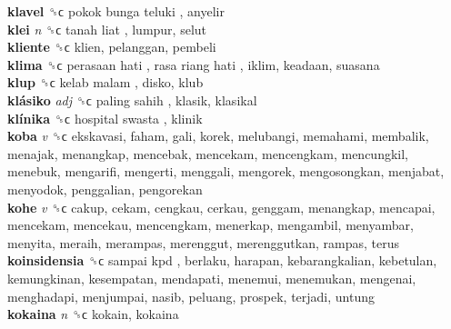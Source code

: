 \textbf{klavel} ␝ϲ   pokok bunga teluki , anyelir  \\
\textbf{klei} \emph{n}  ␝ϲ   tanah liat , lumpur, selut  \\
\textbf{kliente} ␝ϲ  klien, pelanggan, pembeli  \\
\textbf{klima} ␝ϲ   perasaan hati ,  rasa riang hati , iklim, keadaan, suasana  \\
\textbf{klup} ␝ϲ   kelab malam , disko, klub  \\
\textbf{klásiko} \emph{adj}  ␝ϲ   paling sahih , klasik, klasikal  \\
\textbf{klínika} ␝ϲ   hospital swasta , klinik  \\
\textbf{koba} \emph{v}  ␝ϲ  ekskavasi, faham, gali, korek, melubangi, memahami, membalik, menajak, menangkap, mencebak, mencekam, mencengkam, mencungkil, menebuk, mengarifi, mengerti, menggali, mengorek, mengosongkan, menjabat, menyodok, penggalian, pengorekan  \\
\textbf{kohe} \emph{v}  ␝ϲ  cakup, cekam, cengkau, cerkau, genggam, menangkap, mencapai, mencekam, mencekau, mencengkam, menerkap, mengambil, menyambar, menyita, meraih, merampas, merenggut, merenggutkan, rampas, terus  \\
\textbf{koinsidensia} ␝ϲ   sampai kpd , berlaku, harapan, kebarangkalian, kebetulan, kemungkinan, kesempatan, mendapati, menemui, menemukan, mengenai, menghadapi, menjumpai, nasib, peluang, prospek, terjadi, untung  \\
\textbf{kokaina} \emph{n}  ␝ϲ  kokain, kokaina  \\
